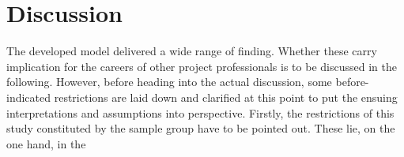 \cleardoublepage

\section{Discussion}
\label{sec:discussion}

The developed model delivered a wide range of finding. Whether these carry implication for the careers of other project professionals is to be discussed in the following. However, before heading into the actual discussion, some before-indicated restrictions are laid down and clarified at this point to put the ensuing interpretations and assumptions into perspective.
Firstly, the restrictions of this study constituted by the sample group have to be pointed out. These lie, on the one hand, in the 

\subsection{}

